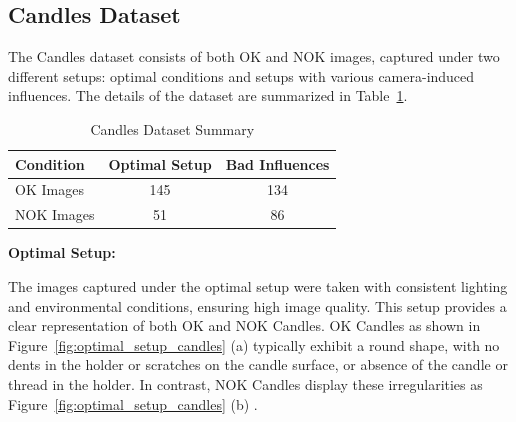 \documentclass[12pt,DIV14,BCOR12mm,a4paper,footinclude=false,headinclude,parskip=half-,twoside,openright,cleardoublepage=empty,toc=index,bibliography=totoc,listof=totoc]{scrreprt}
\numberwithin{equation}{chapter}
\begin{document}
\subsection{Candles Dataset}
\label{sec:candles_dataset}
The Candles dataset consists of both OK and NOK images, captured under two different setups: optimal conditions and setups with various camera-induced influences. The details of the dataset are summarized in Table~\ref{tab:candles-dataset}.

\begin{table}
    \centering
    \caption{Candles Dataset Summary}
    \label{tab:candles-dataset}
    \begin{tabular}{lcc}
        \toprule
        \textbf{Condition} & \textbf{Optimal Setup} & \textbf{Bad Influences} \\ 
        \midrule
        OK Images          & 145                    & 134                     \\ 
        NOK Images         & 51                     & 86                      \\ 
        \bottomrule
    \end{tabular}
\end{table}



\textbf{Optimal Setup:}

The images captured under the optimal setup were taken with consistent lighting and environmental conditions, ensuring high image quality. This setup provides a clear representation of both OK and NOK Candles. OK Candles as shown in Figure~\ref{fig:optimal_setup_candles} (a) typically exhibit a round shape, with no dents in the holder or scratches on the candle surface, or absence of the candle or thread in the holder. In contrast, NOK Candles display these irregularities as Figure~\ref{fig:optimal_setup_candles} (b) .
\end{document}
